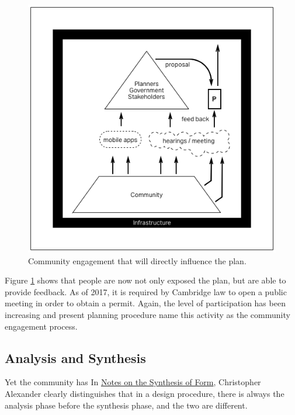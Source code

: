 \begin{figure}[htb]
  \includegraphics[width=\textwidth]{chapters/2/fig/community_engagment.png}               
  \caption[diagram: community engagement]{Community engagement that will directly influence the plan.}
  \label{fig:communityengagement}
\end{figure}

Figure \ref{fig:communityengagement} shows that people are now not only exposed the plan, but are able to provide feedback. As of 2017, it is required by Cambridge law to open a public meeting in order to obtain a permit. Again, the level of participation has been increasing and present planning procedure name this activity as the community engagement process.

\subsection{Analysis and Synthesis}
Yet the community has  In \underline{Notes on the Synthesis of Form}, Christopher Alexander clearly distinguishes that in a design procedure, there is always the analysis phase before the synthesis phase, and the two are different.


